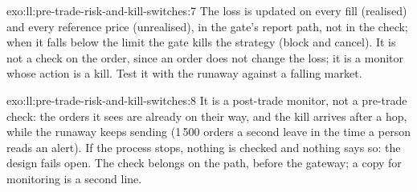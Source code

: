 \begin{solution}{exo:ll:pre-trade-risk-and-kill-switches:7}
The loss is updated on every fill (realised) and every reference price (unrealised), in the gate's report path, not in the
check; when it falls below the limit the gate kills the strategy (block and cancel). It is not a check on the order, since an
order does not change the loss; it is a monitor whose action is a kill. Test it with the runaway against a falling market.
\end{solution}

\begin{solution}{exo:ll:pre-trade-risk-and-kill-switches:8}
It is a post-trade monitor, not a pre-trade check: the orders it sees are already on their way, and the kill arrives after a
hop, while the runaway keeps sending (1\,500 orders a second leave in the time a person reads an alert). If the process stops,
nothing is checked and nothing says so: the design fails open. The check belongs on the path, before the gateway; a copy for
monitoring is a second line.
\end{solution}

